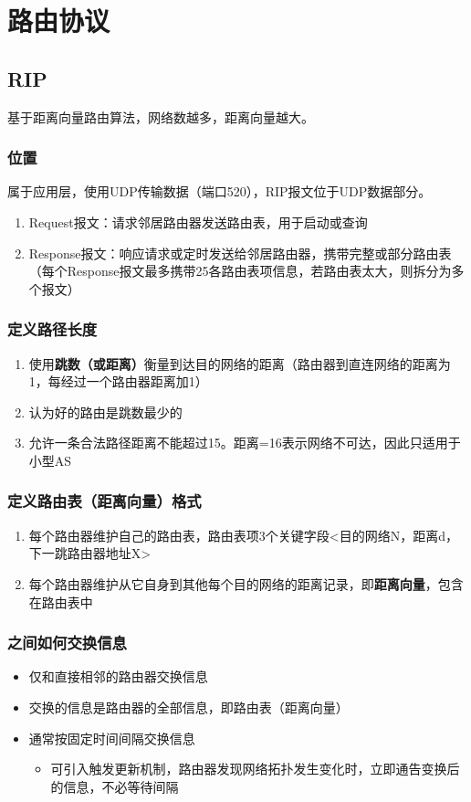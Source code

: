 \section{路由协议}\label{路由协议}

\subsection{RIP}
基于距离向量路由算法，网络数越多，距离向量越大。

\subsubsection{位置}
属于应用层，使用UDP传输数据（端口520），RIP报文位于UDP数据部分。
\begin{enumerate}
    \item Request报文：请求邻居路由器发送路由表，用于启动或查询
    \item Response报文：响应请求或定时发送给邻居路由器，携带完整或部分路由表（每个Response报文最多携带25各路由表项信息，若路由表太大，则拆分为多个报文）
\end{enumerate}


\subsubsection{定义路径长度}
\begin{enumerate}
    \item 使用\textbf{跳数（或距离）}衡量到达目的网络的距离（路由器到直连网络的距离为1，每经过一个路由器距离加1）
    \item 认为好的路由是跳数最少的
    \item 允许一条合法路径距离不能超过15。距离=16表示网络不可达，因此只适用于小型AS
\end{enumerate}


\subsubsection{定义路由表（距离向量）格式}
\begin{enumerate}
    \item 每个路由器维护自己的路由表，路由表项3个关键字段<目的网络N，距离d，下一跳路由器地址X>
    \item 每个路由器维护从它自身到其他每个目的网络的距离记录，即\textbf{距离向量}，包含在路由表中
\end{enumerate}


\subsubsection{之间如何交换信息}
\begin{itemize}
    \item 仅和直接相邻的路由器交换信息
    \item 交换的信息是路由器的全部信息，即路由表（距离向量）
    \item 通常按固定时间间隔交换信息\begin{itemize}
        \item 可引入触发更新机制，路由器发现网络拓扑发生变化时，立即通告变换后的信息，不必等待间隔
    \end{itemize}
\end{itemize}



